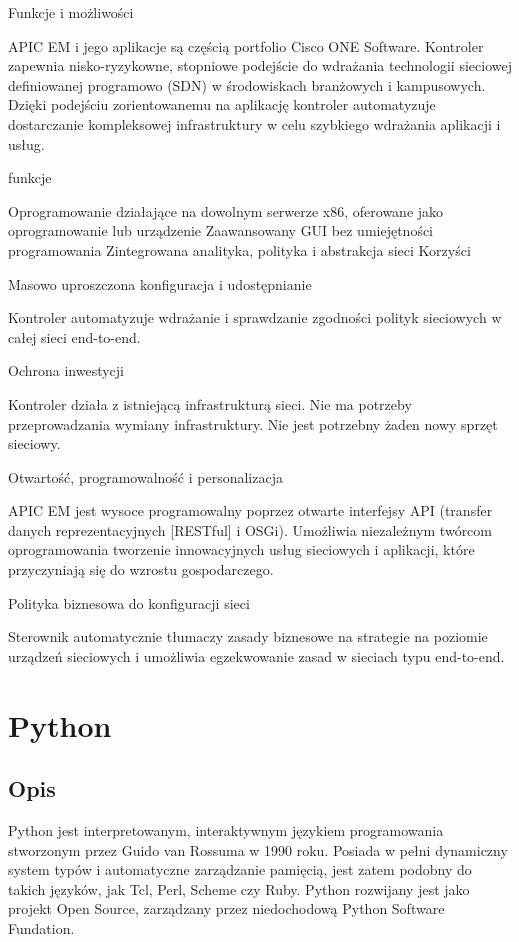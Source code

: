 \documentclass{article}
\begin{document}
Funkcje i możliwości

APIC EM i jego aplikacje są częścią portfolio Cisco ONE Software. Kontroler zapewnia nisko-ryzykowne, stopniowe podejście do wdrażania technologii sieciowej definiowanej programowo (SDN) w środowiskach branżowych i kampusowych. Dzięki podejściu zorientowanemu na aplikację kontroler automatyzuje dostarczanie kompleksowej infrastruktury w celu szybkiego wdrażania aplikacji i usług.

funkcje

Oprogramowanie działające na dowolnym serwerze x86, oferowane jako oprogramowanie lub urządzenie
Zaawansowany GUI bez umiejętności programowania
Zintegrowana analityka, polityka i abstrakcja sieci
Korzyści

Masowo uproszczona konfiguracja i udostępnianie

Kontroler automatyzuje wdrażanie i sprawdzanie zgodności polityk sieciowych w całej sieci end-to-end.

Ochrona inwestycji

Kontroler działa z istniejącą infrastrukturą sieci. Nie ma potrzeby przeprowadzania wymiany infrastruktury. Nie jest potrzebny żaden nowy sprzęt sieciowy.

Otwartość, programowalność i personalizacja

APIC EM jest wysoce programowalny poprzez otwarte interfejsy API (transfer danych reprezentacyjnych [RESTful] i OSGi). Umożliwia niezależnym twórcom oprogramowania tworzenie innowacyjnych usług sieciowych i aplikacji, które przyczyniają się do wzrostu gospodarczego.

Polityka biznesowa do konfiguracji sieci

Sterownik automatycznie tłumaczy zasady biznesowe na strategie na poziomie urządzeń sieciowych i umożliwia egzekwowanie zasad w sieciach typu end-to-end.
\newpage
\section{Python}
\subsection{Opis}
	Python jest interpretowanym, interaktywnym językiem programowania stworzonym przez Guido van Rossuma w 1990 roku. Posiada w pełni dynamiczny system typów i automatyczne zarządzanie pamięcią, jest zatem podobny do takich języków, jak Tcl, Perl, Scheme czy Ruby. Python rozwijany jest jako projekt Open Source, zarządzany przez niedochodową Python Software Fundation.
	
\end{document}
